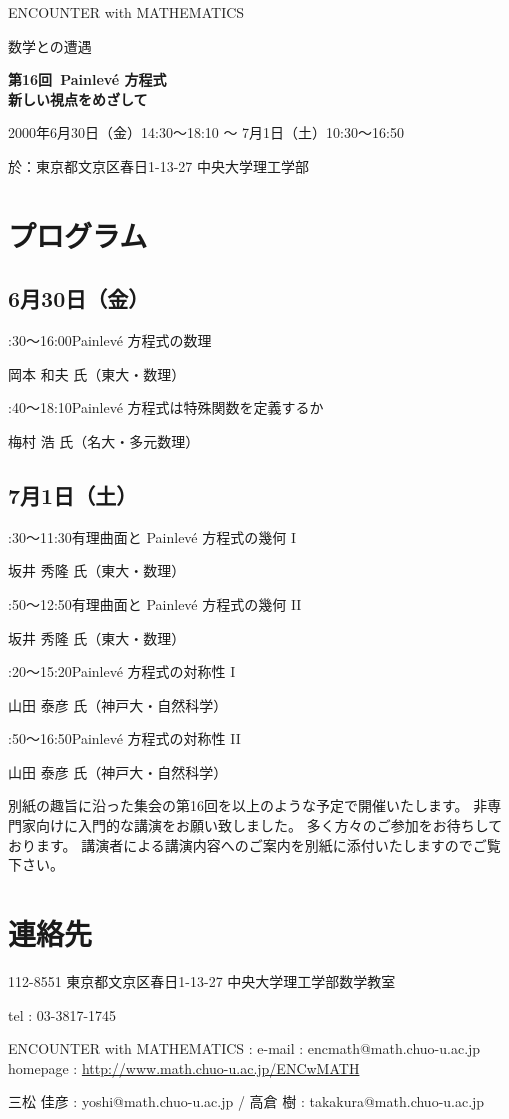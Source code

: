 \documentclass[uplatex,dvipdfmx]{jlreq}
\newcommand{\talk}[3]{%
\noindent
#1\quad #2\par
\hspace*{2em}#3\par\smallskip
}
\newcommand{\EwMnumber}{第16回}
\newcommand{\EwMtitle}{Painlevé 方程式\\[2mm]\large 新しい視点をめざして}
\newcommand{\EwMdate}{2000年6月30日（金）14:30～18:10 ～ 7月1日（土）10:30～16:50}
\newcommand{\EwMplace}{東京都文京区春日1-13-27 中央大学理工学部}
\newcommand{\EwMtitleblock}{

\vspace*{-5mm}

\begin{center}

{\Large ENCOUNTER with MATHEMATICS}

\vspace{2mm}

{\large 数学との遭遇}

\vspace{4mm}

{\Large \bfseries \EwMnumber\ \EwMtitle}

\vspace{4mm}

\EwMdate

\vspace{2mm}

於：\EwMplace

\end{center}

\vspace{2mm}

}
\begin{document}
\EwMtitleblock


\section*{プログラム}

\subsection*{6月30日（金）}

\talk
{14:30～16:00}
{Painlevé 方程式の数理}
{岡本 和夫 氏（東大・数理）}

\talk
{16:40～18:10}
{Painlevé 方程式は特殊関数を定義するか}
{梅村 浩 氏（名大・多元数理）}

\subsection*{7月1日（土）}

\talk
{10:30～11:30}
{有理曲面と Painlevé 方程式の幾何 I}
{坂井 秀隆 氏（東大・数理）}

\talk
{11:50～12:50}
{有理曲面と Painlevé 方程式の幾何 II}
{坂井 秀隆 氏（東大・数理）}

\talk
{14:20～15:20}
{Painlevé 方程式の対称性 I}
{山田 泰彦 氏（神戸大・自然科学）}

\talk
{15:50～16:50}
{Painlevé 方程式の対称性 II}
{山田 泰彦 氏（神戸大・自然科学）}


\bigskip

別紙の趣旨に沿った集会の第16回を以上のような予定で開催いたします。  
非専門家向けに入門的な講演をお願い致しました。  
多く方々のご参加をお待ちしております。  
講演者による講演内容へのご案内を別紙に添付いたしますのでご覧下さい。


\section*{連絡先}

112-8551 東京都文京区春日1-13-27 中央大学理工学部数学教室 

tel : 03-3817-1745  

ENCOUNTER with MATHEMATICS : e-mail : encmath@math.chuo-u.ac.jp  
homepage : \url{http://www.math.chuo-u.ac.jp/ENCwMATH}  

三松 佳彦 : yoshi@math.chuo-u.ac.jp / 高倉 樹 : takakura@math.chuo-u.ac.jp
\end{document}
